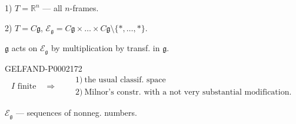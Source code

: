1) $T=\mathbb R^n$ --- all $n$-frames.



2) $T=C\mathfrak g$, $\mathcal E_{\mathfrak g}=C\mathfrak g\times\ldots\times C\mathfrak g\setminus\{\ast,\ldots,\ast\}$.



$\mathfrak g$ acts on $\mathcal E_{\mathfrak g}$ by multiplication by transf. in $\mathfrak g$.



\begin{GelfandAdjacentEvidence}{GELFAND-P000217}{2}
\begin{equation*}
I\text{ finite}\quad\Rightarrow\quad
\begin{aligned}
&1)\ \text{the usual classif. space}\\
&2)\ \text{Milnor's constr. with a not very substantial modification.}
\end{aligned}
\end{equation*}







\end{GelfandAdjacentEvidence}

$\mathcal E_{\mathfrak g}$ --- sequences of nonneg. numbers.



